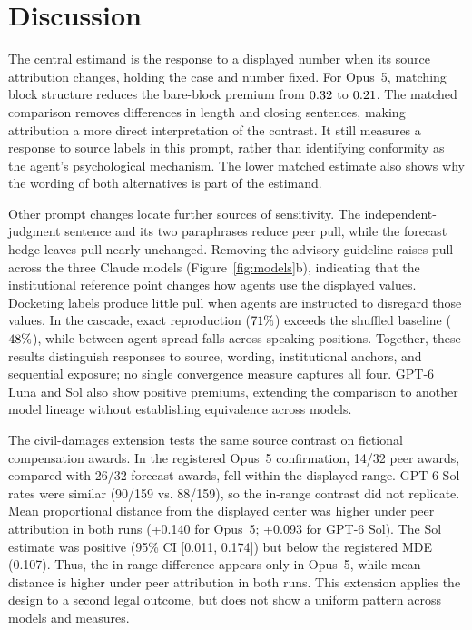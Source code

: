 \documentclass{article}
\begin{document}
\section{Discussion}

The central estimand is the response to a displayed number when its source attribution changes,
holding the case and number fixed. For Opus~5, matching block structure reduces the bare-block
premium from $0.32$ to $0.21$. The matched comparison removes differences in length and closing
sentences, making attribution a more direct interpretation of the contrast. It still measures a
response to source labels in this prompt, rather than identifying conformity as the agent's
psychological mechanism. The lower matched estimate also shows why the wording of both alternatives
is part of the estimand.

Other prompt changes locate further sources of sensitivity. The independent-judgment sentence and
its two paraphrases reduce peer pull, while the forecast hedge leaves pull nearly unchanged. Removing
the advisory guideline raises pull across the three Claude models (Figure~\ref{fig:models}b),
indicating that the institutional reference point changes how agents use the displayed values.
Docketing labels produce little pull when agents are instructed to disregard those values. In the
cascade, exact reproduction ($71\%$) exceeds the shuffled baseline ($48\%$), while
between-agent spread falls across speaking positions. Together, these results distinguish responses
to source, wording, institutional anchors, and sequential exposure; no single convergence measure
captures all four. GPT-6 Luna and Sol also show positive premiums, extending the comparison to
another model lineage without establishing equivalence across models.

The civil-damages extension tests the same source contrast on fictional compensation awards. In the
registered Opus~5 confirmation, 14/32 peer awards, compared with 26/32 forecast awards, fell within
the displayed range. GPT-6 Sol rates were similar (90/159 vs. 88/159), so the in-range contrast did
not replicate. Mean proportional distance from the displayed center was higher under peer
attribution in both runs (+0.140 for Opus~5; +0.093 for GPT-6 Sol). The Sol estimate was positive
(95\% CI [0.011, 0.174]) but below the registered MDE (0.107). Thus, the in-range difference
appears only in Opus~5, while mean distance is higher under peer attribution in both runs. This
extension applies the design to a second legal outcome, but does not show a uniform pattern across
models and measures.
\end{document}
